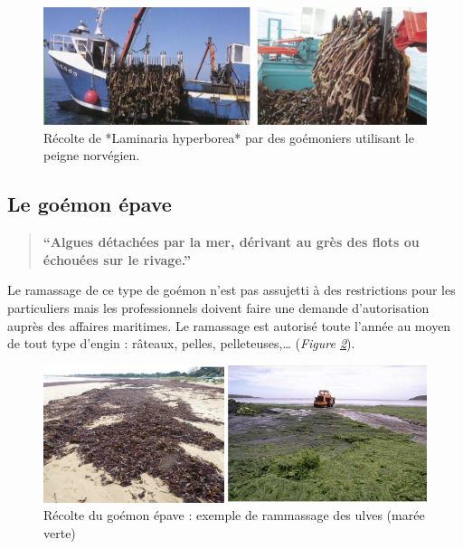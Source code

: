 \documentclass[
]{book}
\begin{document}
\begin{figure}

{\centering \includegraphics[width=14.01in]{images/goemonier_recolte} 

}

\caption{Récolte de *Laminaria hyperborea* par des goémoniers utilisant le peigne norvégien.}\label{fig:goemonierrecolte}
\end{figure}

\hypertarget{le-gouxe9mon-uxe9pave}{%
\subsection{Le goémon épave}\label{le-gouxe9mon-uxe9pave}}

\begin{quote}
\textbf{``Algues détachées par la mer, dérivant au grès des flots ou échouées sur le rivage.''}
\end{quote}

Le ramassage de ce type de goémon n'est pas assujetti à des restrictions pour les particuliers mais les professionnels doivent faire une demande d'autorisation auprès des affaires maritimes. Le ramassage est autorisé toute l'année au moyen de tout type d'engin : râteaux, pelles, pelleteuses,\ldots{} (\emph{Figure \ref{fig:goemonepave}}).

\begin{figure}

{\centering \includegraphics[width=11.12in]{images/goemon_epave} 

}

\caption{Récolte du goémon épave : exemple de rammassage des ulves (marée verte)}\label{fig:goemonepave}
\end{figure}
\end{document}

